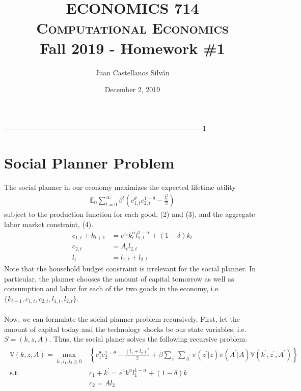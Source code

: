 \documentclass[11pt,a4paper]{article}
\begin{document}
\title{{\huge\textsc{ECONOMICS 714}} \\
\Large\textsc{Computational Economics} \\ Fall 2019 - Homework \#1}
\author{\Large{Juan Castellanos Silv\'{a}n}}
\date{December 2, 2019}
\maketitle

-----------------------------------------------------------------------------------
1

\section{Social Planner Problem}
The social planner in our economy maximizes the expected lifetime utility
\begin{align}
\mathbb{E}_{0} \sum_{t=0}^{\infty} \beta^{t}\left(c_{1, t}^{\theta} c_{2, t}^{1-\theta}-\frac{l_{t}^{2}}{2}\right)
\end{align}
subject to the production function for each good, (2) and (3), and the aggregate labor market constraint, (4).
\begin{align}
c_{1, t}+ k_{t+1}&=e^{z_{t}} k_{t}^{\alpha} l_{1, t}^{1-\alpha}  + (1-\delta) k_{t} \\
c_{2, t} &= A_t l_{2,t} \\
l_{t} &= l_{1,t} + l_{2,t}
\end{align}
Note that the household budget constraint is irrelevant for the social planner. In particular, the planner chooses the amount of capital tomorrow as well as consumption and labor for each of the two goods in the economy, i.e. $\{k_{t+1}, c_{1,t}, c_{2,t}, l_{1,t}, l_{2,t}\}$.
\\
\\
Now, we can formulate the social planner problem recursively. First, let the amount of capital today and the technology shocks be our state variables, i.e. $S = (k , z, A)$. Thus, the social planer solves the following recursive problem:
\begin{align}
\begin{split}
\mathbb{V}(k,z,A)=\max _{k^{\prime}, l_1, l_2 \geq 0}&\left\{c_{1}^{\theta} c_{2}^{1-\theta}-\frac{(l_{1}+l_{2})^{2}}{2}+\beta\sum_{z^{\prime}} \sum_{A^{\prime}}\pi\left(z^{\prime}| z\right) \pi\left(A^{\prime} | A\right) \mathbb{V}\left( k^{\prime}, z^{\prime},A^{\prime}\right)\right\} \\
\text{s.t.} \quad & c_{1} + k^{\prime} = e^{z} k^{\alpha} l_{1}^{1-\alpha} + (1-\delta) k  \\
 & c_{2} = A l_{2}
 \end{split}
\end{align}
\end{document}
